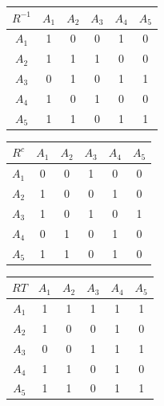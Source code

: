 \documentclass[a5paper,doc,10pt,noapacite]{apa6}
\begin{document}
{{\begin{table}[H]
   \fontsize{7}{11}\selectfont
    \begin{minipage}{.5\linewidth}
      \centering
	\begin{tabular}{c|ccccc} \thickline
	\(R^{-1}\) & \(A_1\) & \(A_2\) & \(A_3\) & \(A_4\) & \(A_5\)  \\
	\hline
    \(A_1\) & 1 & 0 & 0 & 1 & 0  \\
    \(A_2\) & 1 & 1 & 1 & 0 & 0  \\
	\(A_3\) & 0 & 1 & 0 & 1 & 1   \\
	\(A_4\) & 1 & 0 & 1 & 0 & 0   \\
	\(A_5\) & 1 & 1 & 0 & 1 & 1   \\
\end{tabular}
\label{tab:B4} 
    \end{minipage}%
    \begin{minipage}{.5\linewidth}
      \centering
	\begin{tabular}{c|ccccc} \thickline
	\(R^{c}\) & \(A_1\) & \(A_2\) & \(A_3\) & \(A_4\) & \(A_5\)  \\
	\hline
    \(A_1\) & 0 & 0 & 1 & 0 & 0  \\
    \(A_2\) & 1 & 0 & 0 & 1 & 0  \\
	\(A_3\) & 1 & 0 & 1 & 0 & 1   \\
	\(A_4\) & 0 & 1 & 0 & 1 & 0   \\
	\(A_5\) & 1 & 1 & 0 & 1 & 0   \\
\end{tabular}
\label{tab:B5} 
    \end{minipage} 
\end{table}

\begin{table}[H]
\fontsize{7}{11}\selectfont
\begin{center}
	\begin{tabular}{c|ccccc} \thickline
	\(RT\) & \(A_1\) & \(A_2\) & \(A_3\) & \(A_4\) & \(A_5\)  \\
	\hline
    \(A_1\) & 1 & 1 & 1 & 1 & 1  \\
    \(A_2\) & 1 & 0 & 0 & 1 & 0  \\
	\(A_3\) & 0 & 0 & 1 & 1 & 1   \\
	\(A_4\) & 1 & 1 & 0 & 1 & 0   \\
	\(A_5\) & 1 & 1 & 0 & 1 & 1   \\
\end{tabular}
\label{tab:B6} 
\end{center}
\end{table}

}}
\end{document}
